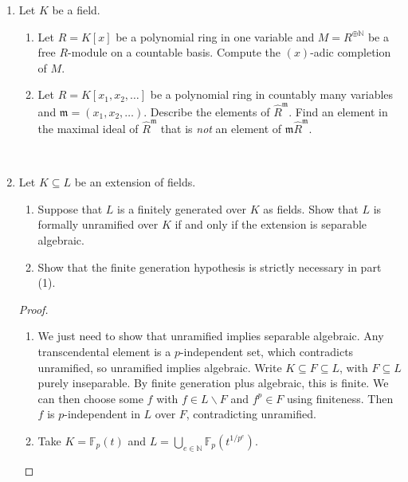 \documentclass{amsart}[12pt]
\newcommand{\F}{\mathbb{F}}
\newcommand{\N}{\mathbb{N}}
\newcommand{\fm}{{\mathfrak m}}
\numberwithin{equation}{section}
\theoremstyle{plain} %
\theoremstyle{definition}
\theoremstyle{remark}
\begin{document}
\begin{enumerate}
\item Let $K$ be a field.
\begin{enumerate}
\item Let $R=K[x]$ be a polynomial ring in one variable and $M= R^{\oplus \N}$ be a free $R$-module on a countable basis. Compute the $(x)$-adic completion of $M$.
\item Let $R=K[x_1,x_2,\dots]$ be a polynomial ring in countably many variables and $\fm=(x_1,x_2,\dots)$. Describe the elements of $\hat{R}^{\fm}$. Find an element in the maximal ideal of $\hat{R}^{\fm}$ that is \emph{not} an element of $\fm \hat{R}^\fm$.
\end{enumerate}

\





\item Let $K\subseteq L$ be an extension of fields.
\begin{enumerate}
\item Suppose that $L$ is a finitely generated over $K$ as fields. Show that $L$ is formally unramified over $K$ if and only if the extension is separable algebraic.
\item Show that the finite generation hypothesis is strictly necessary in part (1).
\end{enumerate}

\begin{proof} 
\begin{enumerate}
\item We just need to show that unramified implies separable algebraic. Any transcendental element is a $p$-independent set, which contradicts unramified, so unramified implies algebraic. Write $K\subseteq F \subseteq L$, with $F\subseteq L$ purely inseparable. By finite generation plus algebraic, this is finite. We can then choose some $f$ with $f\in L \smallsetminus F$ and $f^p\in F$ using finiteness. Then $f$ is $p$-independent in $L$ over $F$, contradicting unramified.
\item Take $K=\F_p(t)$ and $L=\bigcup_{e\in \N} \F_p(t^{1/p^{e}})$.
\end{enumerate}
\end{proof}


\end{enumerate}
\end{document}
